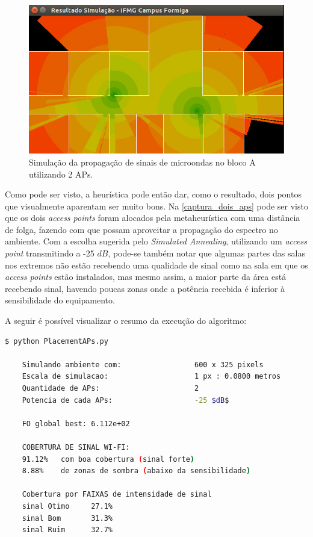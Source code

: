 \documentclass[
	12pt,				%
	twoside,			%
	a4paper,			%
	english,			%
	french,				%
	spanish,			%
	brazil				%
	]{abntex2}
\begin{document}
\begin{figure}[ht]
    \caption{\label{captura_dois_aps} Simulação da propagação de sinais de microondas no bloco A utilizando 2 APs.
    }
    \begin{center}
        \includegraphics[scale=0.6]{imagens/captura-2-aps-2.jpg}
    \end{center}
\end{figure}

Como pode ser visto, a heurística pode então dar, como o resultado, dois
pontos que visualmente aparentam ser muito bons. Na
\autoref{captura_dois_aps} pode ser visto que os dois \emph{access
points} foram alocados pela metaheurística com uma distância de folga,
fazendo com que possam aproveitar a propagação do espectro no ambiente.
Com a escolha sugerida pelo \emph{Simulated Annealing}, utilizando um
\emph{access point} transmitindo a -25 \(dB\), pode-se também notar que
algumas partes das salas nos extremos não estão recebendo uma qualidade
de sinal como na sala em que os \emph{access points} estão instalados,
mas mesmo assim, a maior parte da área está recebendo sinal, havendo
poucas zonas onde a potência recebida é inferior à sensibilidade do
equipamento.

A seguir é possível visualizar o resumo da execução do algoritmo:

\begin{lstlisting}[language=bash]
    $ python PlacementAPs.py 
    
    Simulando ambiente com:                 600 x 325 pixels
    Escala de simulacao:                    1 px : 0.0800 metros
    Quantidade de APs:                      2
    Potencia de cada APs:                   -25 $dB$
    
    FO global best: 6.112e+02
    
    COBERTURA DE SINAL WI-FI:
    91.12%   com boa cobertura (sinal forte)
    8.88%    de zonas de sombra (abaixo da sensibilidade)
    
    Cobertura por FAIXAS de intensidade de sinal
    sinal Otimo     27.1%
    sinal Bom       31.3%
    sinal Ruim      32.7%
\end{lstlisting}
\end{document}
